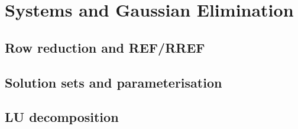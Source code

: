 
\section{Systems and Gaussian Elimination}

\subsection{Row reduction and REF/RREF}


\subsection{Solution sets and parameterisation}


\subsection{LU decomposition}

